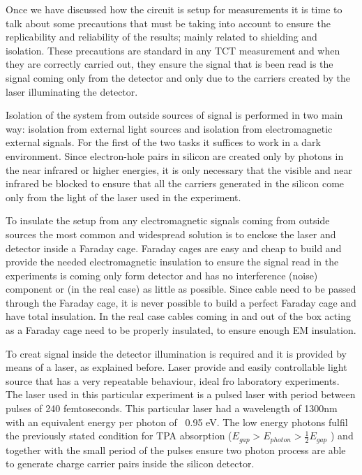 Once we have discussed how the circuit is setup for measurements it is time to talk about some precautions that must be taking into account to ensure the replicability and reliability of the results; mainly related to shielding and isolation. These precautions are standard in any TCT measurement and when they are correctly carried out, they ensure the signal that is been read is the signal coming only from the detector and only due to the carriers created by the laser illuminating the detector.

Isolation of the system from outside sources of signal is performed in two main way: isolation from external light sources and isolation from electromagnetic external signals. For the first of the two tasks it suffices to work in a dark environment. Since electron-hole pairs in silicon are created only by photons in the near infrared or higher energies, it is only necessary that the visible and near infrared be blocked to ensure that all the carriers generated in the silicon come only from the light of the laser used in the experiment.

To insulate the setup from any electromagnetic signals coming from outside sources the most common and widespread solution is to enclose the laser and detector inside a Faraday cage. Faraday cages are easy and cheap to build and provide the needed electromagnetic insulation to ensure the signal read in the experiments is coming only form detector and has no interference (noise) component or (in the real case) as little as possible. Since cable need to be passed through the Faraday cage, it is never possible to build a perfect Faraday cage and have total insulation. In the real case cables coming in and out of the box acting as a Faraday cage need to be properly insulated, to ensure enough EM insulation.

To creat signal inside the detector illumination is required and it is provided by means of a laser, as explained before. Laser provide and easily controllable light source that has a very repeatable behaviour, ideal fro laboratory experiments. The laser used in this particular experiment is a pulsed laser with period between pulses of 240 femtoseconds. This particular laser had a wavelength of 1300nm with an equivalent energy per photon of ~0.95 eV. The low energy photons fulfil the previously stated condition for TPA absorption ($E_{gap} > E_{photon} > \frac{1}{2} E_{gap}$ ) and together with the small period of the pulses ensure two photon process are able to generate charge carrier pairs inside the silicon detector.


